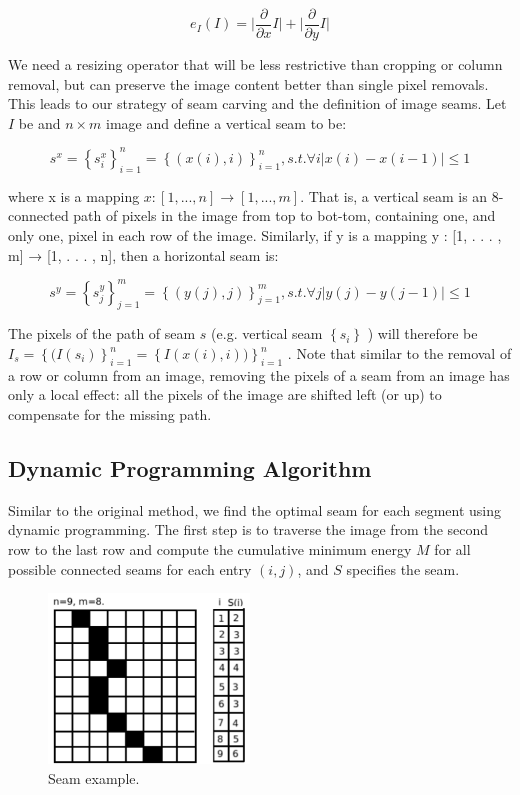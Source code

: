\documentclass[conference]{acmsiggraph}
\begin{document}
\begin{equation}
e_I(I)=   \lvert \frac{\partial}{\partial x} I \rvert + \lvert  \frac{\partial}{\partial y} I 
\rvert 
\end{equation}

We need a resizing operator that will be less restrictive than cropping or column removal, but can preserve the image content better than single pixel removals. This leads to our strategy of seam carving and the definition of image seams. Let $I$ be and $n \times m $ image and define a vertical seam to be:

\begin{equation}
s^{x} = { \left\{ s_{i}^{x} \right\}  }_{i=1}^{n} = 
{\left\{ (x(i),i) \right\}}_{i=1}^{n} ,s.t. \forall i \lvert x(i) - x(i - 1)  \rvert \leq 1  
\end{equation}

where x is a mapping $x : [1, . . . , n] \longrightarrow [1, . . . , m]$. That is, a vertical seam is an 8-connected path of pixels in the image from top to bot-tom, containing one, and only one, pixel in each row of the image. Similarly, if y is a mapping y : [1, . . . , m] → [1, . . . , n], then a horizontal seam is:

\begin{equation}
s^{y} = { \left\{ s_{j}^{y} \right\}  }_{j=1}^{m} = 
{\left\{ (y(j),j) \right\} }_{j=1}^{m} ,s.t. \forall j \lvert y(j) - y(j - 1)  \rvert \leq 1
\end{equation} 


The pixels of the path of seam $s$ (e.g. vertical seam $\left\{ s_{i} \right\}$ ) will therefore be $I_s = {\left\{ (I(s_i) \right\} }_{i=1}^{n} = {\left\{ I (x(i),i)) \right\}}_{i=1}^{n} $  . Note that similar to the removal of a row or column from an image, removing the pixels of a seam from an image has only a local effect: all the pixels of the image are shifted left (or up) to compensate for the missing path.


\subsection{Dynamic Programming Algorithm}
Similar to the original method, we find the optimal seam for each segment using dynamic programming. The first step is to traverse the image from the second row to the last row and compute the cumulative minimum energy $M$ for all possible connected seams for each entry $(i, j)$, and $S$ specifies the seam.


\begin{figure}[ht]
  \centering
  \includegraphics[width=2.1in]{images/seam}
  \caption{ Seam example.}
  \label{fig:seamExample}
\end{figure}
\end{document}
